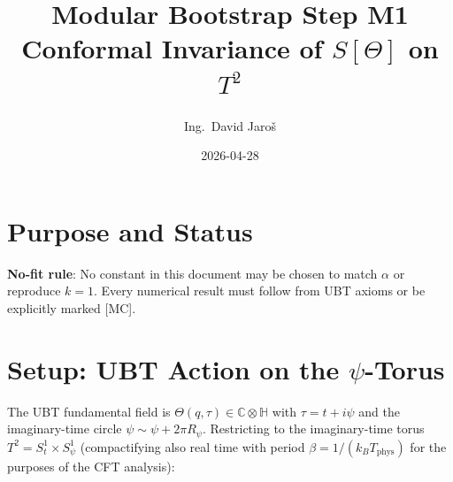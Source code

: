 \documentclass[12pt,a4paper]{article}
\title{\textbf{Modular Bootstrap Step M1}\\
         \large Conformal Invariance of $S[\Theta]$ on $T^2$}
\author{Ing.\ David Jaro\v{s}}
\date{2026-04-28}
\theoremstyle{definition}
\theoremstyle{remark}
\begin{document}
  \maketitle
\fi

\section{Purpose and Status}
\label{sec:m1:purpose}


\begin{warnbox}
\textbf{No-fit rule}: No constant in this document may be chosen to match
$\alpha$ or reproduce $k = 1$.  Every numerical result must follow from
UBT axioms or be explicitly marked [MC].
\end{warnbox}

\section{Setup: UBT Action on the $\psi$-Torus}
\label{sec:m1:setup}

The UBT fundamental field is $\Theta(q, \tau) \in {} \otimes {}$
with $\tau = t + i\psi$ and the imaginary-time circle
$\psi \sim \psi + 2\pi R_\psi$.  Restricting to the imaginary-time torus
$T^2 = S^1_t \times S^1_\psi$ (compactifying also real time with period
$\beta = 1/(k_B T_{})$ for the purposes of the CFT analysis):
\end{document}
